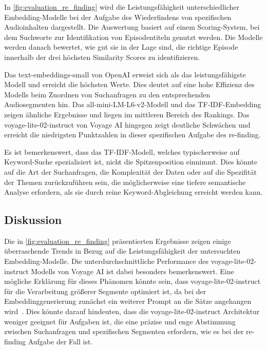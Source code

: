 In \autoref{fig:evaluation_re_finding} wird die Leistungsfähigkeit unterschiedlicher Embedding-Modelle bei der Aufgabe des Wiederfindens von spezifischen Audioinhalten dargestellt. Die Auswertung basiert auf einem Scoring-System, bei dem Suchworte zur Identifikation von Episodentiteln genutzt werden. 
Die Modelle werden danach bewertet, wie gut sie in der Lage sind, die richtige Episode innerhalb der drei höchsten Similarity Scores zu identifizieren.

Das text-embeddings-small von OpenAI erweist sich als das leistungsfähigste Modell und erreicht die höchsten Werte. 
Dies deutet auf eine hohe Effizienz des Modells beim Zuordnen von Suchanfragen zu den entsprechenden Audiosegmenten hin. 
Das all-mini-LM-L6-v2-Modell und das TF-IDF-Embedding zeigen ähnliche Ergebnisse und liegen im mittleren Bereich des Rankings. 
Das voyage-lite-02-instruct von Voyage AI hingegen zeigt deutliche Schwächen und erreicht die niedrigsten Punktzahlen in dieser spezifischen Aufgabe des re-finding.

Es ist bemerkenswert, dass das TF-IDF-Modell, welches typischerweise auf Keyword-Suche spezialisiert ist, nicht die Spitzenposition einnimmt. Dies könnte auf die Art der Suchanfragen, die Komplexität der Daten oder auf die Spezifität der Themen zurückzuführen sein, die möglicherweise eine tiefere semantische Analyse erfordern, als sie durch reine Keyword-Abgleichung erreicht werden kann.


\subsection{Diskussion}

Die in \autoref{fig:evaluation_re_finding} präsentierten Ergebnisse zeigen einige überraschende  Trends in Bezug auf die Leistungsfähigkeit der untersuchten Embedding-Modelle. 
Die unterdurchschnittliche Performance des voyage-lite-02-instruct Modells von Voyage AI ist dabei besonders bemerkenswert. 
Eine mögliche Erklärung für dieses Phänomen könnte sein, dass voyage-lite-02-instruct für die Verarbeitung größerer Segmente optimiert ist, da bei der Embeddinggenerierung zunächst ein weiterer Prompt an die Sätze angehangen wird~\cite{zotero-572}. 
Dies könnte darauf hindeuten, dass die voyage-lite-02-instruct Architektur weniger geeignet für Aufgaben ist, die eine präzise und enge Abstimmung zwischen Suchanfragen und spezifischen Segmenten erfordern, wie es bei der re-finding Aufgabe der Fall ist.

